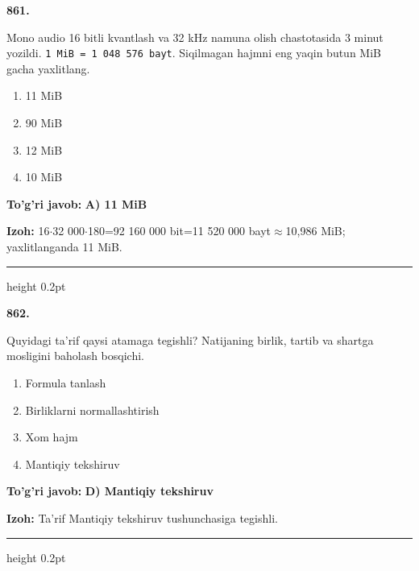 \documentclass[10pt,a4paper,oneside]{article}
\begin{document}
\noindent\textbf{\color{ink}861.}
\par
Mono audio 16 bitli kvantlash va 32 kHz namuna olish chastotasida 3 minut yozildi. \texttt{1 MiB = 1 048 576 bayt}. Siqilmagan hajmni eng yaqin butun MiB gacha yaxlitlang.
\begin{enumerate}[label=\Alph*),leftmargin=9mm]
\item 11 MiB
\item 90 MiB
\item 12 MiB
\item 10 MiB
\end{enumerate}
\begin{tcolorbox}[enhanced,breakable,colback=teal!4,colframe=teal!50!black,boxrule=0.5pt,arc=1.1mm,left=3mm,right=3mm,top=1.7mm,bottom=1.7mm,before skip=2mm,after skip=2mm]
\textbf{\color{teal}To'g'ri javob:} \textbf{A) 11 MiB}
\par\smallskip
\textbf{Izoh:} 16\ensuremath{\cdot}32 000\ensuremath{\cdot}180=92 160 000 bit=11 520 000 bayt\ensuremath{\approx}10,986 MiB; yaxlitlanganda 11 MiB.
\end{tcolorbox}
\vspace{2mm}\hrule height 0.2pt \vspace{3mm}

\noindent\textbf{\color{ink}862.}
\par
Quyidagi ta'rif qaysi atamaga tegishli? Natijaning birlik, tartib va shartga mosligini baholash bosqichi.
\begin{enumerate}[label=\Alph*),leftmargin=9mm]
\item Formula tanlash
\item Birliklarni normallashtirish
\item Xom hajm
\item Mantiqiy tekshiruv
\end{enumerate}
\begin{tcolorbox}[enhanced,breakable,colback=teal!4,colframe=teal!50!black,boxrule=0.5pt,arc=1.1mm,left=3mm,right=3mm,top=1.7mm,bottom=1.7mm,before skip=2mm,after skip=2mm]
\textbf{\color{teal}To'g'ri javob:} \textbf{D) Mantiqiy tekshiruv}
\par\smallskip
\textbf{Izoh:} Ta'rif Mantiqiy tekshiruv tushunchasiga tegishli.
\end{tcolorbox}
\vspace{2mm}\hrule height 0.2pt \vspace{3mm}
\end{document}
